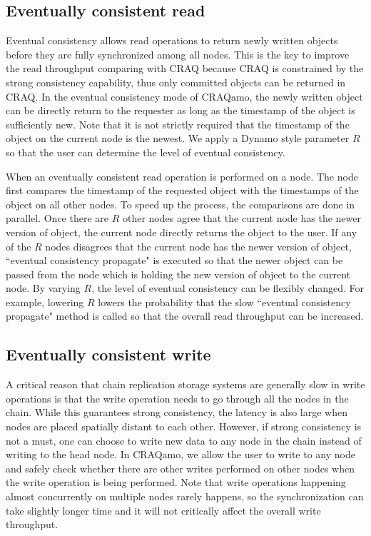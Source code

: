\subsection{Eventually consistent read}
Eventual consistency allows read operations to return newly written objects before they are fully synchronized among all nodes. This is the key to improve the read throughput comparing with CRAQ because CRAQ is constrained by the strong consistency capability, thus only committed objects can be returned in CRAQ. In the eventual consistency mode of CRAQamo, the newly written object can be directly return to the requester as long as the timestamp of the object is sufficiently new. Note that it is not strictly required that the timestamp of the object on the current node is the newest. We apply a Dynamo style parameter $R$ so that the user can determine the level of eventual consistency.

When an eventually consistent read operation is performed on a node. The node first compares the timestamp of the requested object with the timestamps of the object on all other nodes. To speed up the process, the comparisons are done in parallel. Once there are $R$ other nodes agree that the current node has the newer version of object, the current node directly returns the object to the user. If any of the $R$ nodes disagrees that the current node has the newer version of object, ``eventual consistency propagate" is executed so that the newer object can be passed from the node which is holding the new version of object to the current node. By varying $R$, the level of eventual consistency can be flexibly changed. For example, lowering $R$ lowers the probability that the slow ``eventual consistency propagate" method is called so that the overall read throughput can be increased.

\subsection{Eventually consistent write}
A critical reason that chain replication storage systems are generally slow in write operations is that the write operation needs to go through all the nodes in the chain. While this guarantees strong consistency, the latency is also large when nodes are placed spatially distant to each other. However, if strong consistency is not a must, one can choose to write new data to any node in the chain instead of writing to the head node. In CRAQamo, we allow the user to write to any node and safely check whether there are other writes performed on other nodes when the write operation is being performed. Note that write operations happening almost concurrently on multiple nodes rarely happens, so the synchronization can take slightly longer time and it will not critically affect the overall write throughput.


